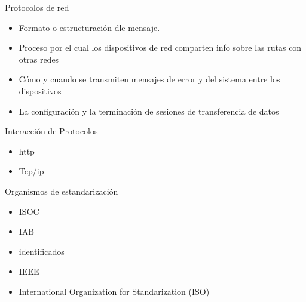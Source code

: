\documentclass{article}
\begin{document}
Protocolos de red
\begin{itemize}
    \item Formato o estructuración dle mensaje.
    \item Proceso por el cual los dispositivos de red
          comparten info sobre las rutas con otras redes
    \item Cómo y cuando se transmiten mensajes de error y del sistema entre los
          dispositivos
    \item La configuración y la terminación de sesiones de transferencia de datos
\end{itemize}
\vspace{0.5cm}

Interacción de Protocolos
\begin{itemize}
    \item http
    \item Tcp/ip
\end{itemize}
\vspace{0.5cm}

Organismos de estandarización
\begin{itemize}
    \item ISOC
    \item IAB
    \item identificados
    \item IEEE
    \item International Organization for Standarization (ISO)
\end{itemize}
\end{document}
